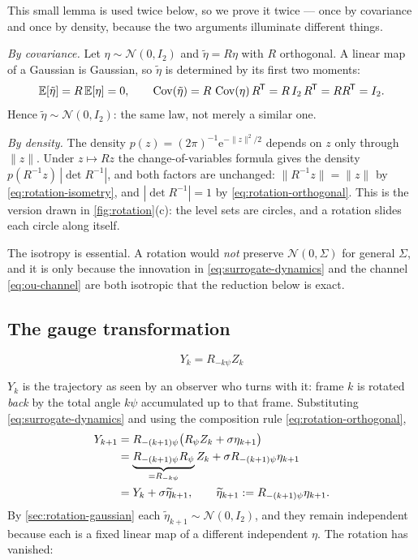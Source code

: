\documentclass[11pt,a4paper]{article}
\newcommand{\E}{\mathbb{E}}
\newcommand{\N}{\mathcal{N}}
\newcommand{\Cov}{\operatorname{Cov}}
\newcommand{\e}{\mathrm e}
\newcommand{\T}{^{\mkern-1.5mu\mathsf{T}}}
\begin{document}
This small lemma is used twice below, so we prove it twice --- once by covariance and once by
density, because the two arguments illuminate different things.

\emph{By covariance.} Let $\eta\sim\N(0,I_2)$ and $\tilde\eta=R\eta$ with $R$ orthogonal. A
linear map of a Gaussian is Gaussian, so $\tilde\eta$ is determined by its first two moments:
\begin{equation}
 \E[\tilde\eta]=R\,\E[\eta]=0,
 \qquad
 \Cov(\tilde\eta)=R\,\Cov(\eta)\,R\T=R\,I_2\,R\T=RR\T=I_2 .
\end{equation}
Hence $\tilde\eta\sim\N(0,I_2)$: the same law, not merely a similar one.

\emph{By density.} The density $p(z)=(2\pi)^{-1}\e^{-\|z\|^2/2}$ depends on $z$ only through
$\|z\|$. Under $z\mapsto Rz$ the change-of-variables formula gives the density
$p(R^{-1}z)\,|\det R^{-1}|$, and both factors are unchanged: $\|R^{-1}z\|=\|z\|$ by
\eqref{eq:rotation-isometry}, and $|\det R^{-1}|=1$ by \eqref{eq:rotation-orthogonal}. This is
the version drawn in \cref{fig:rotation}(c): the level sets are circles, and a rotation slides
each circle along itself.

The isotropy is essential. A rotation would \emph{not} preserve $\N(0,\Sigma)$ for general
$\Sigma$, and it is only because the innovation in \eqref{eq:surrogate-dynamics} and the
channel \eqref{eq:ou-channel} are both isotropic that the reduction below is exact.

\subsection{The gauge transformation}\label{sec:gauge}

\begin{definitionbox}[De-rotation]
\begin{equation}
 Y_k=R_{-k\psi}Z_k
 \label{eq:derotation}
\end{equation}
\end{definitionbox}

$Y_k$ is the trajectory as seen by an observer who turns with it: frame $k$ is rotated
\emph{back} by the total angle $k\psi$ accumulated up to that frame. Substituting
\eqref{eq:surrogate-dynamics} and using the composition rule
\eqref{eq:rotation-orthogonal},
\begin{align}
 Y_{k+1}
 &=R_{-(k+1)\psi}\big(R_\psi Z_k+\sigma\eta_{k+1}\big)
 \notag\\
 &=\underbrace{R_{-(k+1)\psi}R_\psi}_{=R_{-k\psi}}Z_k
   +\sigma R_{-(k+1)\psi}\eta_{k+1}
 \notag\\
 &=Y_k+\sigma\widetilde\eta_{k+1},
 \qquad \widetilde\eta_{k+1}:=R_{-(k+1)\psi}\eta_{k+1} .
\end{align}
By \cref{sec:rotation-gaussian} each $\widetilde\eta_{k+1}\sim\N(0,I_2)$, and they remain
independent because each is a fixed linear map of a different independent $\eta$. The rotation
has vanished:
\end{document}
